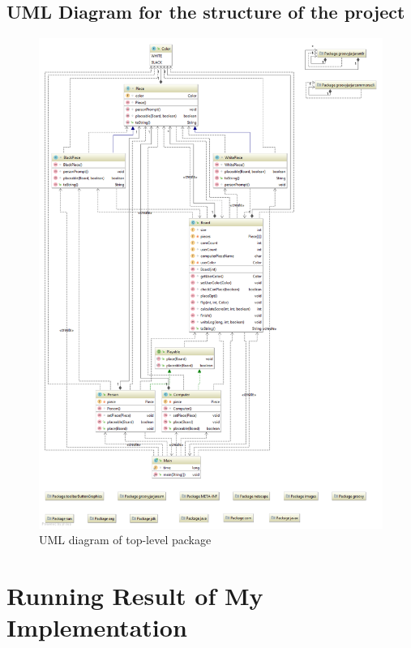 \documentclass[a4paper]{report}
\begin{document}
\section{UML Diagram for the structure of the project}
\begin{figure}
  \centering
  \includegraphics[width=14cm]{Top-LevelPackage.png}
  \caption{UML diagram of top-level package}\label{1}
\end{figure}

\chapter{Running Result of My Implementation}
\end{document}
